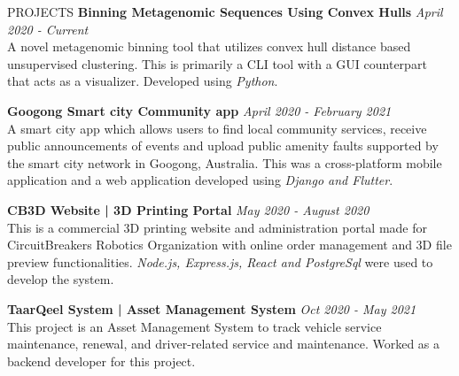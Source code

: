 \documentclass{cv}
\begin{document}
\begin{rSection}{PROJECTS}
    {\bf Binning Metagenomic Sequences Using Convex Hulls}                  \hfill {\em April 2020 - Current}
    \\
    A novel metagenomic binning tool that utilizes convex hull distance
based unsupervised clustering. This is primarily a CLI tool with a GUI counterpart that acts as a visualizer. Developed using \textit{Python}.
    \\ 
    \par\vspace{7pt}

    {\bf Googong Smart city Community app}                  \hfill {\em April 2020 - February 2021}
    \\
    A smart city app which allows users to find local community services,
    receive public announcements of events and upload public amenity
    faults supported by the smart city network in Googong, Australia.
    This was a cross-platform mobile application and a web application developed
    using \textit{Django and Flutter}.
    \\ 
    \par\vspace{7pt}

    {\bf CB3D Website | 3D Printing Portal}                  \hfill {\em May 2020 - August 2020}
    \\
    This is a commercial 3D printing website and administration portal made for CircuitBreakers Robotics Organization with online order management and 3D file preview functionalities. \textit{Node.js, Express.js, React and PostgreSql} were used to develop the system.
    \\ 
    \par\vspace{7pt}

    {\bf TaarQeel System | Asset Management System}     \hfill {\em Oct 2020 - May 2021}
    \\
    This project is an Asset Management System to track vehicle service maintenance, renewal, and driver-related service and maintenance. Worked as a backend developer for this project.
    \\ 
    \par
    \par\vspace{7pt}


\end{rSection}
\end{document}
